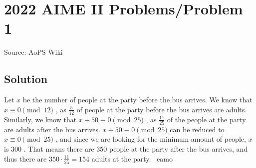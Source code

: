 \documentclass[12pt]{article}
\begin{document}
\section*{{2022 AIME II Problems/Problem 1}}
Source: AoPS Wiki

\subsection*{Solution}
Let $x$ be the number of people at the party before the bus arrives. We know that $x\equiv 0\pmod {12}$ , as $\frac{5}{12}$ of people at the party before the bus arrives are adults. Similarly, we know that $x + 50 \equiv 0 \pmod{25}$ , as $\frac{11}{25}$ of the people at the party are adults after the bus arrives. $x + 50 \equiv 0 \pmod{25}$ can be reduced to $x \equiv 0 \pmod{25}$ , and since we are looking for the minimum amount of people, $x$ is $300$ . That means there are $350$ people at the party after the bus arrives, and thus there are $350 \cdot \frac{11}{25} = \boxed{154}$ adults at the party. ~eamo
\end{document}
